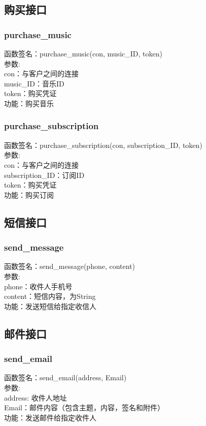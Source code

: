 \subsection{购买接口}

\subsubsection{purchase\_music}
\noindent
函数签名：purchase\_music(con, music\_ID, token)\\
参数:\\
con：与客户之间的连接\\
music\_ID：音乐ID\\
token：购买凭证\\
功能：购买音乐

\subsubsection{purchase\_subscription}
\noindent
函数签名：purchase\_subscription(con, subscription\_ID, token)\\
参数:\\
con：与客户之间的连接\\
subscription\_ID：订阅ID\\
token：购买凭证\\
功能：购买订阅

\subsection{短信接口}

\subsubsection{send\_message}
\noindent
函数签名：send\_message(phone, content)\\
参数:\\
phone：收件人手机号\\
content：短信内容，为String\\
功能：发送短信给指定收信人

\subsection{邮件接口}

\subsubsection{send\_email}
\noindent
函数签名：send\_email(address, Email)\\
参数:\\
address: 收件人地址\\
Email：邮件内容（包含主题，内容，签名和附件）\\
功能：发送邮件给指定收件人